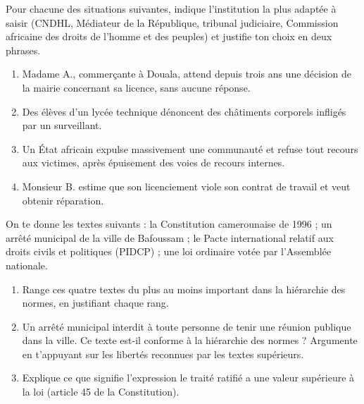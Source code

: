 \documentclass[11pt]{article}
\begin{document}
\begin{exercice}
Pour chacune des situations suivantes, indique l'institution la plus adaptée à saisir (CNDHL, Médiateur de la République, tribunal judiciaire, Commission africaine des droits de l'homme et des peuples) et justifie ton choix en deux phrases.

\begin{enumerate}
\item Madame A., commerçante à Douala, attend depuis trois ans une décision de la mairie concernant sa licence, sans aucune réponse.
\item Des élèves d'un lycée technique dénoncent des châtiments corporels infligés par un surveillant.
\item Un État africain expulse massivement une communauté et refuse tout recours aux victimes, après épuisement des voies de recours internes.
\item Monsieur B. estime que son licenciement viole son contrat de travail et veut obtenir réparation.
\end{enumerate}
\end{exercice}

\begin{exercice}
On te donne les textes suivants : la Constitution camerounaise de 1996 ; un arrêté municipal de la ville de Bafoussam ; le Pacte international relatif aux droits civils et politiques (PIDCP) ; une loi ordinaire votée par l'Assemblée nationale.

\begin{enumerate}
\item Range ces quatre textes du plus au moins important dans la hiérarchie des normes, en justifiant chaque rang.
\item Un arrêté municipal interdit à toute personne de tenir une réunion publique dans la ville. Ce texte est-il conforme à la hiérarchie des normes ? Argumente en t'appuyant sur les libertés reconnues par les textes supérieurs.
\item Explique ce que signifie l'expression \og le traité ratifié a une valeur supérieure à la loi \fg{} (article 45 de la Constitution).
\end{enumerate}
\end{exercice}
\end{document}
